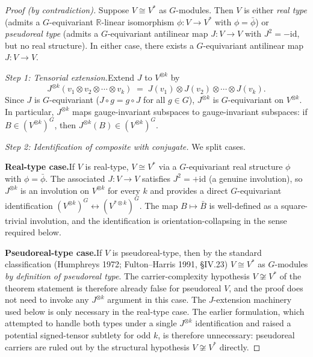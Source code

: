 \documentclass[11pt,a4paper]{article}
\theoremstyle{definition}
\begin{document}
\begin{proof}[Proof (by contradiction)]

Suppose $V \cong V^*$ as $G$-modules.  Then $V$ is either \emph{real type}
(admits a $G$-equivariant $\mathbb{R}$-linear isomorphism $\phi: V \to V^*$
with $\phi = \bar\phi$) or \emph{pseudoreal type} (admits a $G$-equivariant
antilinear map $J: V \to V$ with $J^2 = -\mathrm{id}$, but no real structure).
In either case, there exists a $G$-equivariant antilinear map
$J: V \to V$.

\textit{Step 1: Tensorial extension.}\quad Extend $J$ to $V^{\otimes k}$ by
\[
  J^{\otimes k}(v_1 \otimes v_2 \otimes \cdots \otimes v_k)
  \;=\; J(v_1) \otimes J(v_2) \otimes \cdots \otimes J(v_k).
\]
Since $J$ is $G$-equivariant ($J \circ g = g \circ J$ for all $g \in G$),
$J^{\otimes k}$ is $G$-equivariant on $V^{\otimes k}$.  In particular,
$J^{\otimes k}$ maps gauge-invariant subspaces to gauge-invariant subspaces:
if $B \in (V^{\otimes k})^G$, then $J^{\otimes k}(B) \in (V^{\otimes k})^G$.

\textit{Step 2: Identification of composite with conjugate.}\quad
We split cases.

\smallskip\noindent\textbf{Real-type case.}\quad If $V$ is real-type,
$V \cong V^*$ via a $G$-equivariant real structure $\phi$ with
$\phi = \bar\phi$.  The associated $J: V \to V$ satisfies $J^2 = +\mathrm{id}$
(a genuine involution), so $J^{\otimes k}$ is an involution on $V^{\otimes k}$
for every $k$ and provides a direct $G$-equivariant identification
$(V^{\otimes k})^G \leftrightarrow (V^{*\otimes k})^G$.  The map
$B \mapsto \bar B$ is well-defined as a square-trivial involution, and
the identification is orientation-collapsing in the sense required below.

\smallskip\noindent\textbf{Pseudoreal-type case.}\quad If $V$ is pseudoreal-type,
then by the standard classification (Humphreys 1972; Fulton--Harris 1991,
\S IV.23) $V \cong V^*$ as $G$-modules \emph{by definition of pseudoreal
type}.  The carrier-complexity hypothesis $V \not\cong V^*$ of the theorem
statement is therefore already false for pseudoreal $V$, and the proof
does not need to invoke any $J^{\otimes k}$ argument in this case.
The $J$-extension machinery used below is only necessary in the real-type
case.  The earlier formulation, which attempted to handle both types
under a single $J^{\otimes k}$ identification and raised a potential
signed-tensor subtlety for odd $k$, is therefore unnecessary: pseudoreal
carriers are ruled out by the structural hypothesis $V \not\cong V^*$
directly.


\end{proof}
\end{document}

